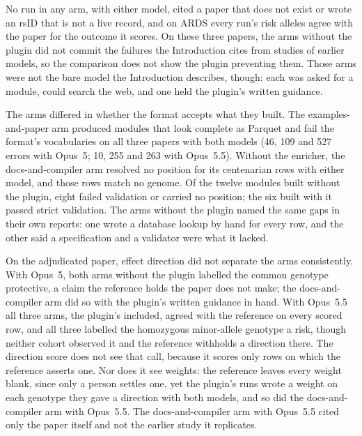 \documentclass[11pt,a4paper]{article}
\begin{document}
No run in any arm, with either model, cited a paper that does not exist or
wrote an rsID that is not a live record, and on ARDS every run's risk alleles
agree with the paper for the outcome it scores. On these three papers, the
arms without the plugin did not commit the failures the Introduction cites
from studies of earlier models, so the comparison does not show the plugin
preventing them. Those arms were not the bare model the Introduction
describes, though: each was asked for a module, could search the web, and one
held the plugin's written guidance.

The arms differed in whether the format accepts what they built. The
examples-and-paper arm produced modules that look complete as Parquet and fail
the format's vocabularies on all three papers with both models (46, 109 and
527 errors with Opus~5; 10, 255 and 263 with Opus~5.5). Without the enricher, the docs-and-compiler arm resolved
no position for its centenarian rows with either model, and those rows match
no genome. Of the twelve modules built without the plugin, eight failed
validation or carried no position; the six built with it passed strict
validation. The arms without the plugin named the same gaps in their own
reports: one wrote a database lookup by hand for every row, and the other said
a specification and a validator were what it lacked.

On the adjudicated paper, effect direction did not separate the arms
consistently. With Opus~5, both arms without the plugin labelled the common
genotype protective, a claim the reference holds the paper does not make; the
docs-and-compiler arm did so with the plugin's written guidance in hand. With
Opus~5.5 all three arms, the plugin's included, agreed with the reference on
every scored row, and all three labelled the homozygous minor-allele genotype
a risk, though neither cohort observed it and the reference withholds a
direction there. The direction score does not see that call, because it
scores only rows on which the reference asserts one. Nor does it see weights:
the reference leaves every weight blank, since only a person settles one, yet
the plugin's runs wrote a weight on each genotype they gave a direction with
both models, and so did the docs-and-compiler arm with Opus~5.5. The docs-and-compiler arm
with Opus~5.5 cited only the paper itself and not the earlier study it
replicates.
\end{document}
